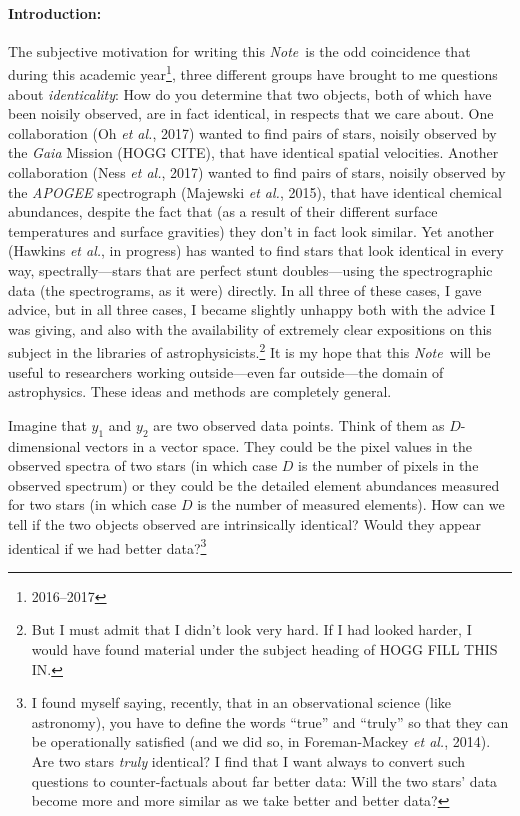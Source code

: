 \documentclass[12pt,letterpaper]{article}
\newcommand{\foreign}[1]{\textsl{#1}}
\newcommand{\project}[1]{\textsl{#1}}
\newcommand{\acronym}[1]{{\small{#1}}}
\newcommand{\documentname}{\textsl{Note}}
\newcommand{\etal}{\foreign{et al.}}
\begin{document}
\paragraph{Introduction:}
The subjective motivation for writing this \documentname\ is the odd coincidence
that during this academic year\footnote{2016--2017}, three different groups
have brought to me questions about \emph{identicality}: How do you
determine that two objects, both of which have been noisily observed,
are in fact identical, in respects that we care about. One collaboration
(Oh \etal, 2017)
wanted to find pairs of stars, noisily observed by
the \project{Gaia} Mission (HOGG CITE), that have identical spatial
velocities.
Another collaboration (Ness \etal, 2017) wanted to find pairs
of stars, noisily observed by the \project{\acronym{APOGEE}}
spectrograph (Majewski \etal, 2015), that have identical chemical abundances, despite the fact
that (as a result of their different surface temperatures and surface
gravities) they don't in fact look similar.
Yet another (Hawkins \etal, in progress) has wanted to find stars that
look identical in every way, spectrally---stars that are perfect stunt
doubles---using the spectrographic data (the spectrograms, as it were)
directly. In all three of these cases, I gave advice, but in all three
cases, I became slightly unhappy both with the advice I was giving, and
also with the availability of extremely clear expositions on this subject
in the libraries of astrophysicists.\footnote{But I must admit that I didn't
  look very hard. If I had looked harder, I would have found material under
  the subject heading of HOGG FILL THIS IN.}
It is my hope that this \documentname\ will be useful to researchers working
outside---even far outside---the domain of astrophysics. These ideas and methods 
are completely general.

Imagine that $y_1$ and $y_2$ are two observed data points. Think of
them as $D$-dimensional vectors in a vector space. They could be the
pixel values in the observed spectra of two stars (in which case $D$
is the number of pixels in the observed spectrum) or they could be
the detailed element abundances measured for two stars (in which case
$D$ is the number of measured elements). How can we tell if the two
objects observed are intrinsically identical? Would they appear
identical if we had better data?\footnote{I found myself saying,
  recently, that in an observational science (like astronomy), you
  have to define the words ``true'' and ``truly'' so that they can be
  operationally satisfied (and we did so, in Foreman-Mackey \etal, 2014).
  Are two stars \emph{truly} identical?  I
  find that I want always to convert such questions to
  counter-factuals about far better data: Will the two stars' data
  become more and more similar as we take better and better data?}
\end{document}

